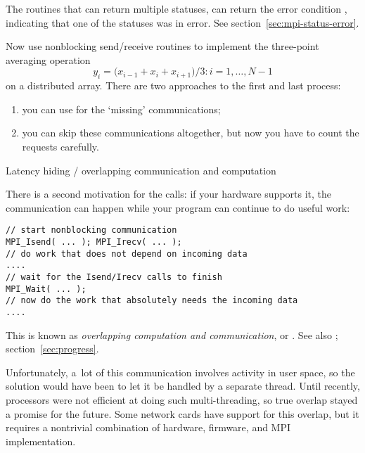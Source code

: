 \begin{remark}
  The routines that can return multiple statuses,
  can return the error condition ,
  indicating that one of the statuses was in error.
  See section~\ref{sec:mpi-status-error}.
\end{remark}

\begin{exercise}
  \label{ex:3ptnonblock}
  Now use nonblocking send/receive routines to implement
  the three-point averaging operation
  \[ y_i=\bigl( x_{i-1}+x_i+x_{i+1} \bigr)/3\colon i=1,\ldots,N-1 \]
  on a distributed array.
  There are two approaches to the first and last process:
  \begin{enumerate}
  \item you can use  for the `missing' communications;
  \item you can skip these communications altogether, but now you have to
    count the requests carefully.
  \end{enumerate}

\end{exercise}

 {Latency hiding / overlapping communication and computation}

There is a second motivation for the  calls:
if your hardware supports it, the communication can
happen
while your program can continue to do useful work:
\begin{lstlisting}
// start nonblocking communication
MPI_Isend( ... ); MPI_Irecv( ... );
// do work that does not depend on incoming data
....
// wait for the Isend/Irecv calls to finish
MPI_Wait( ... );
// now do the work that absolutely needs the incoming data
....
\end{lstlisting}
This is known as \emph{overlapping computation and communication}, or
%
.
See also ; section~\ref{sec:progress}.

Unfortunately, a~lot of this
communication involves activity in user space, so the solution would
have been to let it be handled by a separate thread. Until recently,
processors were not efficient at doing such multi-threading, so true
overlap stayed a promise for the future. Some network cards have
support for this overlap, but it requires a nontrivial combination of
hardware, firmware, and MPI implementation.

